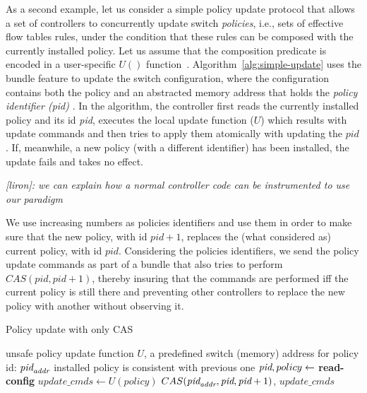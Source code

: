 \documentclass[conference]{sigcomm-alternate}
\newcommand{\addr}{\emph{addr}\xspace}
\newcommand{\pid}{\emph{pid}\xspace}
\newcommand{\ufunc}{U} %
\newcommand{\liron}[1]{\textit{\textcolor{mygreen}{[liron]: #1}}} %
\begin{document}
{As a second example, let us consider a simple policy update protocol that
allows a set of  controllers to concurrently update switch  \emph{policies}, i.e., sets of
effective flow tables rules, under the
condition that these rules can be composed with the currently installed
policy.
Let us assume that the composition predicate is encoded in a user-specific
$\textit{\ufunc}()$ function~\cite{cpc}.
Algorithm~\ref{alg:simple-update} uses the bundle feature to update the switch configuration, where the configuration contains both the policy and an abstracted memory address that holds the \emph{policy identifier (pid)} .
In the algorithm, the controller first reads the currently installed
policy and its id \emph{pid}, executes the local update function ($\textit{\ufunc}$) which results with update commands and then tries to apply them atomically with updating the $pid$. If, meanwhile, a new
policy (with a different identifier) has been installed, the update
fails and takes no effect.


\liron{we can explain how a normal controller code can be instrumented to use our paradigm}


We use increasing numbers as policies
identifiers and use them in order to make sure that the new policy, with id
$pid+1$, replaces the (what considered as) current policy, with id
$pid$. Considering the policies identifiers, we send the policy update
commands as part of a bundle that also tries to perform
$CAS(pid,pid+1)$, thereby insuring that the commands are
performed iff the current policy is still there and preventing other
controllers to replace the new policy with another without observing it.



\begin{algorithm}[h]
    \caption{Policy update with only CAS}
    \label{alg:simple-update}
    \begin{algorithmic}[1]
    \Require unsafe policy update function $\ufunc$, a predefined switch (memory) address for policy id: $\pid_{\addr}$
    \Ensure installed policy is consistent with previous one
 		\Repeat
 			\State $\pid,policy\gets$ \textbf{read-config} %
 			\State $update\_cmds\gets \ufunc(policy)$
 			\startTxn
	 			\State $CAS(\pid_{\addr},\pid,\pid+1)$,
	 			\State $update\_cmds$ %
 			\endTxn
			\Return


\end{algorithmic}
\end{algorithm}}
\end{document}
